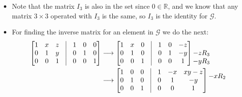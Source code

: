 \documentclass[final,expand]{problemset}
\begin{document}
{\begin{itemize}
\begin{align*}
\begin{bmatrix}
				1 & x & z\\ 0 & 1 & y\\ 0 & 0 & 1
			\end{bmatrix} \cdot \begin{bmatrix}
				1 & a + k & m + an + c\\
				0 & 1 & n + b\\
				0 & 0 & 1
			\end{bmatrix}\\
			&= \begin{bmatrix}
				1 & a + k + x & m + an + c + xn+ bx\\
				0 & 1 & b + n + y\\
				0 & 0 & 1
			\end{bmatrix}
		\end{align*}
		And we can see that they are the same, so $\cdot$ is associative.

		\item Note that the matrix $I_3$ is also in the set since $0 \in \mathbb{R}$, and we know that any matrix $3 \times 3$ operated with $I_3$ is the same, so $I_3$ is the identity for $\mathcal{G}$.
		\item For finding the inverse matrix for an element in $\mathcal{G}$ we do the next:
		\begin{align*}
			\begin{bmatrix}
				1 & x & z &\vline & 1 & 0 & 0\\ 0 & 1 & y &\vline & 0 & 1 & 0\\ 0 & 0 & 1 &\vline & 0 & 0 &1
			\end{bmatrix} &\longrightarrow \begin{bmatrix}
				1 & x & 0 &\vline & 1 & 0 & -z\\ 0 & 1 & 0 &\vline & 0 & 1 & -y\\ 0 & 0 & 1 &\vline & 0 & 0 &1
			\end{bmatrix} \begin{matrix}
				\\ -zR_3 \\ -yR_3
			\end{matrix}\\
			&\longrightarrow \begin{bmatrix}
				1 & 0 & 0 &\vline & 1 & -x & xy-z\\ 0 & 1 & 0 &\vline & 0 & 1 & -y\\ 0 & 0 & 1 &\vline & 0 & 0 &1
			\end{bmatrix}\begin{matrix}
				-xR_2\\ \\ 
			\end{matrix}
		\end{align*}


\end{itemize}}
\end{document}
